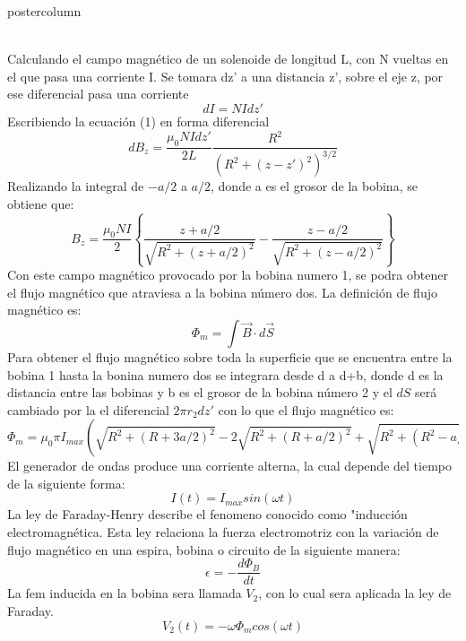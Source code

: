 \documentclass{beamer}
\begin{document}
\begin{frame}
\begin{columns}
\begin{column}{.5\textwidth}
\begin{beamercolorbox}[center]{postercolumn}
\begin{myblock}{\textcolor{white}{Marco Teórico}}
\begin{equation*}
\end{equation*}
Calculando el campo magnético de un solenoide de longitud L, con N vueltas en el que pasa una 
corriente I. Se tomara dz' a una distancia z', sobre el eje z, por ese diferencial pasa una corriente 
\begin{equation*}
dI=N I dz'
\end{equation*}
Escribiendo la ecuación (1) en forma diferencial
\begin{equation*}
dB_z = \frac{\mu_0 N I dz'}{2L} \frac{R^2}{(R^2+(z-z')^2)^{3/2}}
\end{equation*}
Realizando la integral de $-a/2$ a $a/2$, donde a es el grosor de la bobina, se obtiene que:
\begin{equation*}
B_z = \frac{\mu_0 N I}{2} \left \{ \frac{z+a/2}{\sqrt{R^2+(z+a/2)^2}} - \frac{z-a/2}{\sqrt{R^2+(z-a/2)^2}}\right \}
\end{equation*}
Con este campo magnético provocado por la bobina numero 1, se podra obtener el flujo magnético que atraviesa a la bobina número dos. 
La definición de flujo magnético es:
\begin{equation*}
\Phi_m = \int \vec{B} \cdot d\vec{S}
\end{equation*}
Para obtener el flujo magnético sobre toda la superficie que se encuentra entre la bobina 1 hasta la bonina numero dos se integrara desde d a d+b, donde d es la distancia entre las bobinas y b es el grosor de la bobina número 2 y el $dS$ será cambiado por la el diferencial $2\pi r_2 dz'$ con lo que el flujo magnético es:\\
\begin{equation*}
\Phi_m = \mu_0 \pi  I_{max}( \sqrt{R^2+(R+3a/2)^2}-2\sqrt{R^2+(R+a/2)^2}+\sqrt{R^2+(R^2-a/2)^2})
\end{equation*}
El generador de ondas produce una corriente alterna, la cual depende del tiempo de la siguiente forma:
\begin{equation*}
I(t)= I_{max} sin(\omega t)
\end{equation*}
La ley de Faraday-Henry describe el fenomeno conocido como "inducción electromagnética. Esta ley relaciona la fuerza electromotriz con la variación de flujo magnético en una espira, bobina o circuito de la siguiente manera:
\begin{equation*}
 \epsilon= -\frac{d\Phi_B}{dt}
\end{equation*}
La fem inducida en la bobina sera llamada $V_2$, con lo cual sera aplicada la ley de Faraday.
\begin{equation*}
V_2 (t) = -  \omega \Phi_m cos(\omega t)

\end{equation*}
\end{myblock}
\end{beamercolorbox}
\end{column}
\end{columns}
\end{frame}
\end{document}
